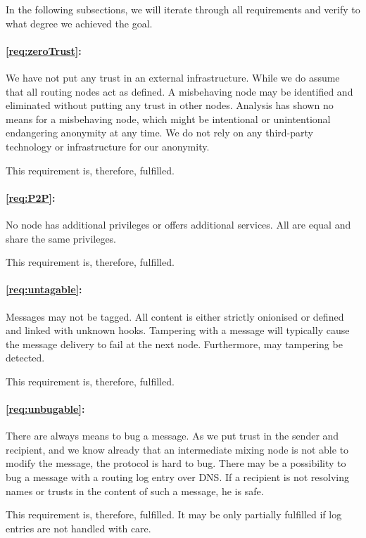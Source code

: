 In the following subsections, we will iterate through all requirements and verify to what degree we achieved the goal.

\paragraph*{\ref{req:zeroTrust}:} 
We have not put any trust in an external infrastructure. While we do assume that all routing nodes act as defined. A misbehaving node may be identified and eliminated without putting any trust in other nodes. Analysis has shown no means for a misbehaving node, which might be intentional or unintentional endangering anonymity at any time. We do not rely on any third-party technology or infrastructure for our anonymity. 

This requirement is, therefore, fulfilled.

\paragraph*{\ref{req:P2P}:} 
No node has additional privileges or offers additional services. All are equal and share the same privileges.

This requirement is, therefore, fulfilled.

\paragraph*{\ref{req:untagable}:} 
Messages may not be tagged. All content is either strictly onionised or defined and linked with unknown hooks. Tampering with a message will typically cause the message delivery to fail at the next node. Furthermore, may tampering be detected.

This requirement is, therefore, fulfilled.

\paragraph*{\ref{req:unbugable}:} 
There are always means to bug a message. As we put trust in the sender and recipient, and we know already that an intermediate mixing node is not able to modify the message, the protocol is hard to bug. There may be a possibility to bug a message with a routing log entry over DNS. If a recipient is not resolving names or trusts in the content of such a message, he is safe.

This requirement is, therefore, fulfilled. It may be only partially fulfilled if log entries are not handled with care.

